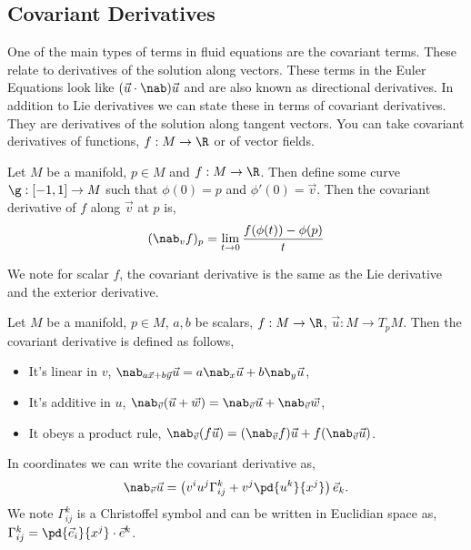 \subsection{Covariant Derivatives}
One of the main types of terms in fluid equations are the covariant terms. These relate to derivatives of the solution along vectors. These terms in the Euler Equations look like $(\vec u \cdot \nab)\vec u$ and are also known as directional derivatives. In addition to Lie derivatives we can state these in terms of covariant derivatives. They are derivatives of the solution along tangent vectors. You can take covariant derivatives of functions, $f : M \to \R$ or of vector fields.
\begin{ndefi}
  Let $M$ be a manifold, $p \in M$ and $f : M \to \R$. Then define some curve $\g : [-1, 1] \to M$ such that $\phi(0) = p$ and $\phi'(0) = \vec v$. Then the covariant derivative of $f$ along $\vec v$ at $p$ is,
  $$ (\nab_v f)_p = \lim_{t \to 0}\frac{f(\phi(t)) - \phi(p)}{t} $$
\end{ndefi}
\noindent
We note for scalar $f$, the covariant derivative is the same as the Lie derivative and the exterior derivative.

\begin{ndefi}
  Let $M$ be a manifold, $p \in M$, $a,b$ be scalars, $f : M \to \R$, $\vec u : M \to T_pM$. Then the covariant derivative is defined as follows,
  \begin{itemize}
    \item It's linear in $v$, $\nab_{a\vec x + b\vec y}\vec u = a\nab_x\vec u + b\nab_y \vec u $,
    \item It's additive in $u$, $\nab_{\vec v} (\vec u + \vec w) = \nab_{\vec v} \vec u + \nab_{\vec v}\vec w$,
    \item It obeys a product rule, $\nab_{\vec v}(f\vec u) = (\nab_{\vec v}f)\vec u + f(\nab_{\vec v}\vec u) $.
  \end{itemize}
\end{ndefi}

\noindent
In coordinates we can write the covariant derivative as,
$$ \nab_{\vec v}\vec u = \left( v^i u^j \Gamma_{ij}^k + v^j \pd{u^k}{x^j} \right)\vec e_k. $$
We note $\Gamma_{ij}^k$ is a Christoffel symbol and can be written in Euclidian space as, $\Gamma_{ij}^k = \pd {\vec e_i}{x^j} \cdot \vec e^k$.
